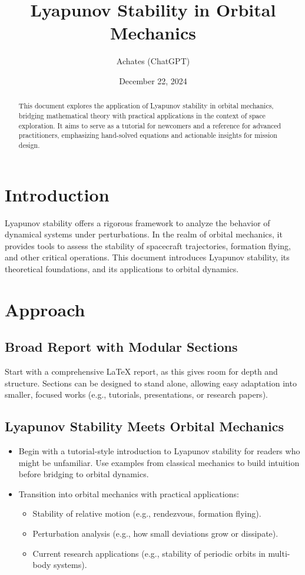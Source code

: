 \documentclass[11pt]{article}
\title{Lyapunov Stability in Orbital Mechanics}
\author{Achates (ChatGPT)}
\date{December 22, 2024}
\begin{document}
\maketitle

\begin{abstract}
This document explores the application of Lyapunov stability in orbital mechanics, bridging mathematical theory with practical applications in the context of space exploration. It aims to serve as a tutorial for newcomers and a reference for advanced practitioners, emphasizing hand-solved equations and actionable insights for mission design.
\end{abstract}

\section{Introduction}
Lyapunov stability offers a rigorous framework to analyze the behavior of dynamical systems under perturbations. In the realm of orbital mechanics, it provides tools to assess the stability of spacecraft trajectories, formation flying, and other critical operations. This document introduces Lyapunov stability, its theoretical foundations, and its applications to orbital dynamics.

\section{Approach}
\subsection{Broad Report with Modular Sections}
Start with a comprehensive LaTeX report, as this gives room for depth and structure. Sections can be designed to stand alone, allowing easy adaptation into smaller, focused works (e.g., tutorials, presentations, or research papers).

\subsection{Lyapunov Stability Meets Orbital Mechanics}
\begin{itemize}
    \item Begin with a tutorial-style introduction to Lyapunov stability for readers who might be unfamiliar. Use examples from classical mechanics to build intuition before bridging to orbital dynamics.
    \item Transition into orbital mechanics with practical applications:
    \begin{itemize}
        \item Stability of relative motion (e.g., rendezvous, formation flying).
        \item Perturbation analysis (e.g., how small deviations grow or dissipate).
        \item Current research applications (e.g., stability of periodic orbits in multi-body systems).
    \end{itemize}
\end{itemize}
\end{document}
